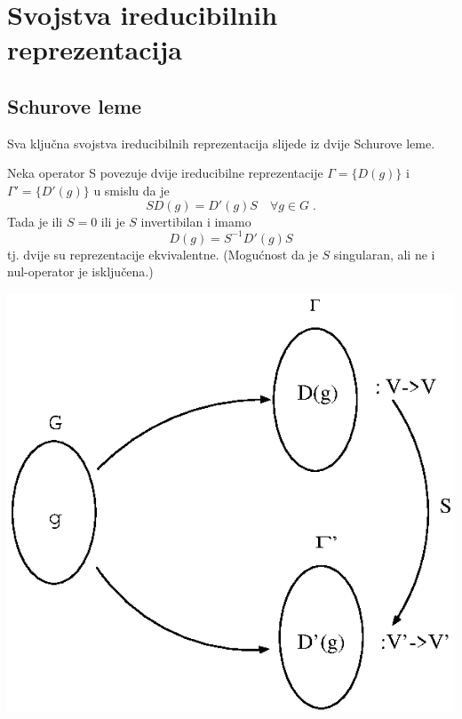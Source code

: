 

\chapter{Svojstva ireducibilnih reprezentacija}

\section{Schurove leme}

Sva ključna svojstva ireducibilnih reprezentacija slijede iz 
dvije Schurove leme.

\begin{teorem}
Neka operator S povezuje dvije  ireducibilne
reprezentacije $\Gamma=\{D(g)\}$ i $\Gamma'=\{D'(g)\}$ u smislu da je
\begin{displaymath}
  SD(g)=D'(g)S  \quad \forall g\in G  \;.
\end{displaymath}
Tada je ili $S=0$ ili je $S$ invertibilan i imamo
\begin{displaymath}
D(g)=S^{-1}D'(g)S
\end{displaymath}
tj. dvije su reprezentacije ekvivalentne. (Mogućnost
da je $S$ singularan, ali ne i nul-operator je isključena.)
\end{teorem}

\centerline{\includegraphics[scale=0.8]{pics/schur.eps}}

